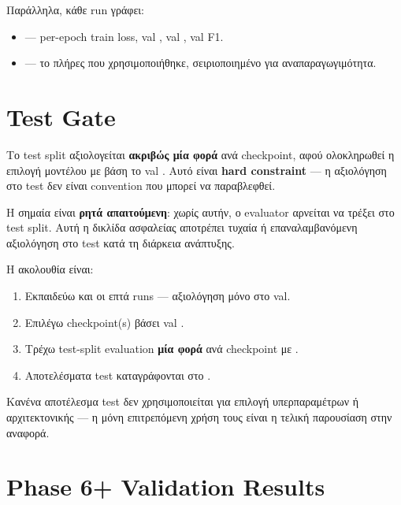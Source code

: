 Παράλληλα, κάθε run γράφει:
\begin{itemize}
  \item {} —
        per-epoch train loss, val \AUC{}, val \EER{}, val F1.
  \item {} —
        το πλήρες  που χρησιμοποιήθηκε,
        σειριοποιημένο για αναπαραγωγιμότητα.
\end{itemize}

\section{Test Gate}
\label{sec:test-gate}

Το test split αξιολογείται \textbf{ακριβώς μία φορά} ανά checkpoint,
αφού ολοκληρωθεί η επιλογή μοντέλου με βάση το val \AUC{}.
Αυτό είναι \textbf{hard constraint} — η αξιολόγηση στο test
δεν είναι convention που μπορεί να παραβλεφθεί.

Η σημαία  είναι \textbf{ρητά απαιτούμενη}:
χωρίς αυτήν, ο evaluator αρνείται να τρέξει στο test split.
Αυτή η δικλίδα ασφαλείας αποτρέπει τυχαία ή επαναλαμβανόμενη
αξιολόγηση στο test κατά τη διάρκεια ανάπτυξης.

Η ακολουθία είναι:
\begin{enumerate}
  \item Εκπαιδεύω και οι επτά runs — αξιολόγηση μόνο στο val.
  \item Επιλέγω checkpoint(s) βάσει val \AUC{}.
  \item Τρέχω test-split evaluation \textbf{μία φορά} ανά checkpoint
        με .
  \item Αποτελέσματα test καταγράφονται στο .
\end{enumerate}

Κανένα αποτέλεσμα test δεν χρησιμοποιείται για
επιλογή υπερπαραμέτρων ή αρχιτεκτονικής —
η μόνη επιτρεπόμενη χρήση τους
είναι η τελική παρουσίαση στην αναφορά.

\section{Phase 6+ Validation Results}
\label{sec:phase6-val-results}

